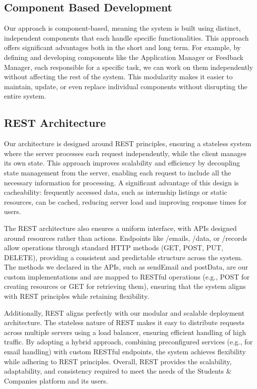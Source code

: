 \subsection{Component Based Development}
Our approach is component-based, meaning the system is built using distinct, independent components that each handle specific functionalities. This approach offers significant advantages both in the short and long term. For example, by defining and developing components like the Application Manager or Feedback Manager, each responsible for a specific task, we can work on them independently without affecting the rest of the system. This modularity makes it easier to maintain, update, or even replace individual components without disrupting the entire system.  

\subsection{REST Architecture}
Our architecture is designed around REST principles, ensuring a stateless system where the server processes each request independently, while the client manages its own state. This approach improves scalability and efficiency by decoupling state management from the server, enabling each request to include all the necessary information for processing. A significant advantage of this design is cacheability: frequently accessed data, such as internship listings or static resources, can be cached, reducing server load and improving response times for users.

The REST architecture also ensures a uniform interface, with APIs designed around resources rather than actions. Endpoints like /emails, /data, or /records allow operations through standard HTTP methods (GET, POST, PUT, DELETE), providing a consistent and predictable structure across the system. The methods we declared in the APIs, such as sendEmail and postData, are our custom implementations and are mapped to RESTful operations (e.g., POST for creating resources or GET for retrieving them), ensuring that the system aligns with REST principles while retaining flexibility.

Additionally, REST aligns perfectly with our modular and scalable deployment architecture. The stateless nature of REST makes it easy to distribute requests across multiple servers using a load balancer, ensuring efficient handling of high traffic. By adopting a hybrid approach, combining preconfigured services (e.g., for email handling) with custom RESTful endpoints, the system achieves flexibility while adhering to REST principles. Overall, REST provides the scalability, adaptability, and consistency required to meet the needs of the Students \& Companies platform and its users.

